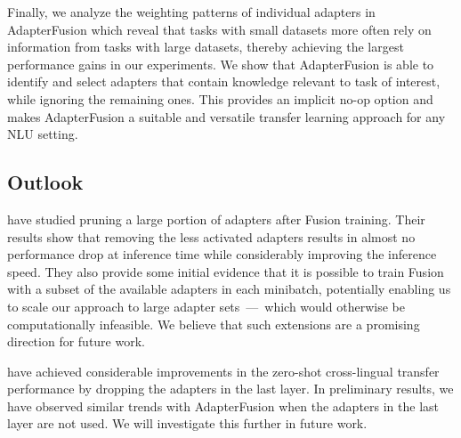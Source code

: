 Finally, we analyze the  weighting patterns of individual adapters in AdapterFusion which reveal that tasks with small datasets more often rely on information from tasks with large datasets, thereby achieving the largest performance gains in our experiments. We  show that AdapterFusion is able to identify and select adapters that contain knowledge relevant to task of interest, while ignoring the remaining ones. This provides an implicit no-op option and makes AdapterFusion a suitable and versatile transfer learning approach for any NLU setting.

\subsection{Outlook}

\citet{rueckle2020adapterdrop} have studied pruning a large portion of adapters after Fusion training. Their results show that removing the less activated adapters results in almost no performance drop at inference time while considerably improving the inference speed. They also provide some initial evidence that it is possible to train Fusion with a subset of the available adapters in each minibatch, potentially enabling us to scale our approach to large adapter sets~---~which would otherwise be computationally infeasible. We believe that such extensions are a promising direction for future work.

\citet{Pfeiffer20Gib} have achieved considerable improvements in the zero-shot cross-lingual transfer performance by dropping the adapters in the last layer. In preliminary results, we have observed similar trends with AdapterFusion when the adapters in the last layer are not used. We will investigate this further in future work.  


